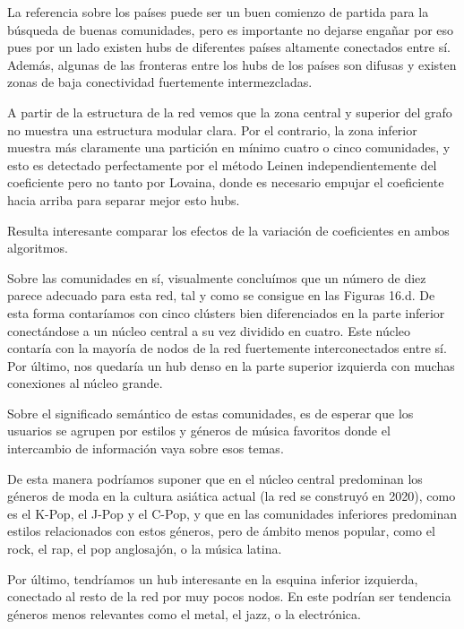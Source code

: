 La referencia sobre los países puede ser un buen comienzo de partida para la búsqueda de buenas comunidades, pero es importante no dejarse engañar por eso pues por un lado existen hubs de diferentes países altamente conectados entre sí. Además, algunas de las fronteras entre los hubs de los países son difusas y existen zonas de baja conectividad fuertemente intermezcladas.

\vspace{\baselineskip}

A partir de la estructura de la red vemos que la zona central y superior del grafo no muestra una estructura modular clara. Por el contrario, la zona inferior muestra más claramente una partición en mínimo cuatro o cinco comunidades, y esto es detectado perfectamente por el método Leinen independientemente del coeficiente pero no tanto por Lovaina, donde es necesario empujar el coeficiente hacia arriba para separar mejor esto hubs.

\vspace{\baselineskip}

Resulta interesante comparar los efectos de la variación de coeficientes en ambos algoritmos.

\vspace{\baselineskip}

Sobre las comunidades en sí, visualmente concluímos que un número de diez parece adecuado para esta red, tal y como se consigue en las Figuras 16.d. De esta forma contaríamos con cinco clústers bien diferenciados en la parte inferior conectándose a un núcleo central a su vez dividido en cuatro. Este núcleo contaría con la mayoría de nodos de la red fuertemente interconectados entre sí. Por último, nos quedaría un hub denso en la parte superior izquierda con muchas conexiones al núcleo grande.

\vspace{\baselineskip}

Sobre el significado semántico de estas comunidades, es de esperar que los usuarios se agrupen por estilos y géneros de música favoritos donde el intercambio de información vaya sobre esos temas. 

De esta manera podríamos suponer que en el núcleo central predominan los géneros de moda en la cultura asiática actual (la red se construyó en 2020), como es el K-Pop, el J-Pop y el C-Pop, y que en las comunidades inferiores predominan estilos relacionados con estos géneros, pero de ámbito menos popular, como el rock, el rap, el pop anglosajón, o la música latina.

Por último, tendríamos un hub interesante en la esquina inferior izquierda, conectado al resto de la red por muy pocos nodos. En este podrían ser tendencia géneros menos relevantes como el metal, el jazz, o la electrónica.